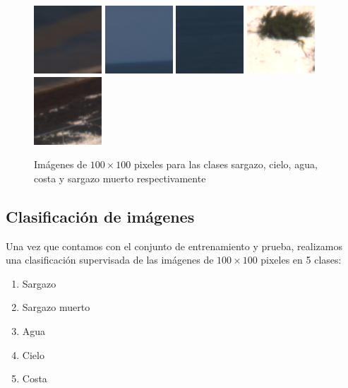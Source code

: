 \documentclass[conference]{IEEEtran}
\begin{document}
\begin{figure}[H]
    \centering
    \includegraphics[scale=0.8]{imgs/sargassum_reduced.png}
    \includegraphics[scale=0.8]{imgs/sky_reduced.png}
    \includegraphics[scale=0.8]{imgs/water_reduced.png}
    \includegraphics[scale=0.8]{imgs/coast_reduced.png}
    \includegraphics[scale=0.8]{imgs/dsargassum_reduced.png}                
    \caption{Imágenes de $100 \times 100$ pixeles para las clases sargazo, cielo, agua, costa y sargazo muerto respectivamente}
    \label{fig:reduced_images}
\end{figure}

\subsection{Clasificación de imágenes}

Una vez que contamos con el conjunto de entrenamiento y prueba, realizamos una clasificación supervisada de las imágenes de $100\times 100$ pixeles en 5 clases: 
\begin{enumerate}
    \item Sargazo
    \item Sargazo muerto
    \item Agua
    \item Cielo
    \item Costa
\end{enumerate}
\end{document}
